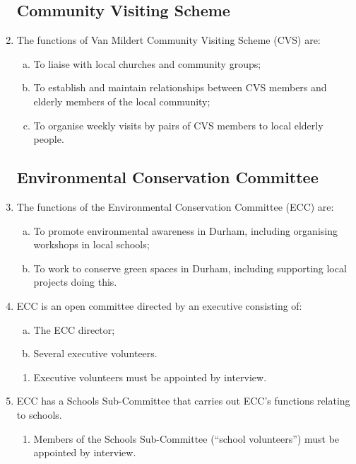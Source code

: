 \documentclass[12pt]{article}
\begin{document}
\begin{enumerate}
    \subsection{Community Visiting Scheme}
    \item The functions of Van Mildert Community Visiting Scheme (CVS) are:
    \begin{enumerate}[(a)]
        \item To liaise with local churches and community groups;
        \item To establish and maintain relationships between CVS members and elderly members of the local community;
        \item To organise weekly visits by pairs of CVS members to local elderly people.
    \end{enumerate}
    \subsection{Environmental Conservation Committee}
    \item The functions of the Environmental Conservation Committee (ECC) are:
    \begin{enumerate}[(a)]
        \item To promote environmental awareness in Durham, including organising workshops in local schools;
        \item To work to conserve green spaces in Durham, including supporting local projects doing this.
    \end{enumerate}
    \item ECC is an open committee directed by an executive consisting of:
    \begin{enumerate}[(a)]
        \item The ECC director;
        \item Several executive volunteers.
    \end{enumerate}
    \begin{enumerate}
        \item Executive volunteers must be appointed by interview.
    \end{enumerate}
    \item ECC has a Schools Sub-Committee that carries out ECC's functions relating to schools.
    \begin{enumerate}
        \item Members of the Schools Sub-Committee (``school volunteers'') must be appointed by interview.
    \end{enumerate}

\end{enumerate}
\end{document}
